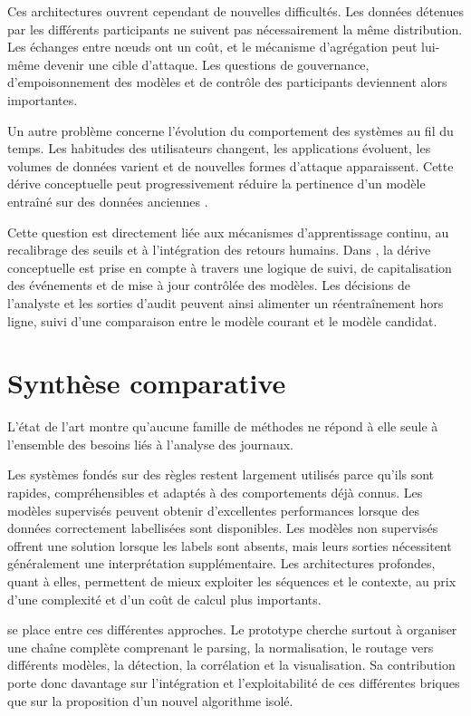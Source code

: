 Ces architectures ouvrent cependant de nouvelles difficultés. Les données détenues par les différents participants ne suivent pas nécessairement la même distribution. Les échanges entre nœuds ont un coût, et le mécanisme d'agrégation peut lui-même devenir une cible d'attaque. Les questions de gouvernance, d'empoisonnement des modèles et de contrôle des participants deviennent alors importantes.

Un autre problème concerne l'évolution du comportement des systèmes au fil du temps. Les habitudes des utilisateurs changent, les applications évoluent, les volumes de données varient et de nouvelles formes d'attaque apparaissent. Cette dérive conceptuelle peut progressivement réduire la pertinence d'un modèle entraîné sur des données anciennes \cite{shyaa2024conceptdrift}.

Cette question est directement liée aux mécanismes d'apprentissage continu, au recalibrage des seuils et à l'intégration des retours humains. Dans \logminer{}, la dérive conceptuelle est prise en compte à travers une logique de suivi, de capitalisation des événements et de mise à jour contrôlée des modèles. Les décisions de l'analyste et les sorties d'audit peuvent ainsi alimenter un réentraînement hors ligne, suivi d'une comparaison entre le modèle courant et le modèle candidat.

\section{Synthèse comparative}

L'état de l'art montre qu'aucune famille de méthodes ne répond à elle seule à l'ensemble des besoins liés à l'analyse des journaux.

Les systèmes fondés sur des règles restent largement utilisés parce qu'ils sont rapides, compréhensibles et adaptés à des comportements déjà connus. Les modèles supervisés peuvent obtenir d'excellentes performances lorsque des données correctement labellisées sont disponibles. Les modèles non supervisés offrent une solution lorsque les labels sont absents, mais leurs sorties nécessitent généralement une interprétation supplémentaire. Les architectures profondes, quant à elles, permettent de mieux exploiter les séquences et le contexte, au prix d'une complexité et d'un coût de calcul plus importants.

\logminer{} se place entre ces différentes approches. Le prototype cherche surtout à organiser une chaîne complète comprenant le parsing, la normalisation, le routage vers différents modèles, la détection, la corrélation et la visualisation. Sa contribution porte donc davantage sur l'intégration et l'exploitabilité de ces différentes briques que sur la proposition d'un nouvel algorithme isolé.

